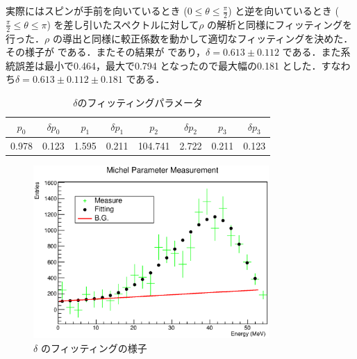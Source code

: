 実際にはスピンが手前を向いているとき ($0\leq\theta\leq\frac{\pi}{2}$) と逆を向いているとき ($\frac{\pi}{2}\leq\theta\leq\pi$) を差し引いたスペクトルに対して$\rho$ の解析と同様にフィッティングを行った．$\rho$ の導出と同様に較正係数を動かして適切なフィッティングを決めた．その様子が である．またその結果が であり，$\delta=0.613\pm0.112$ である．また系統誤差は最小で0.464，最大で0.794 となったので最大幅の0.181 とした．すなわち$\delta=0.613\pm0.112\pm0.181$ である．
\begin{table}[bht]
\centering
\caption{$\delta$のフィッティングパラメータ}
\begin{tabular}{cccccccc}
$p_0$ & $\delta p_0$ & $p_1$ & $\delta p_1$ & $p_2$ & $\delta p_2$ & $p_3$ & $\delta p_3$ \\ \hline
0.978 & 0.123 & 1.595 & 0.211 & 104.741 & 2.722 & 0.211 & 0.123 \\
\end{tabular}
\label{hatano_tab:delta}
\end{table}

\begin{figure}[bht]
\centering
\includegraphics[width=0.8\textwidth]{figure/hatano/delta.eps}
\caption{$\delta$ のフィッティングの様子}
\label{hatano_fig:delta}
\end{figure}

%

